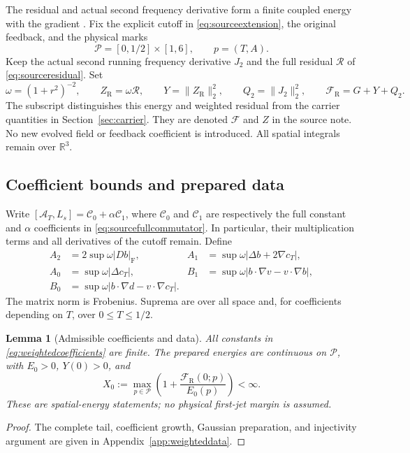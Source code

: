 \documentclass[11pt]{article}
\numberwithin{equation}{section}
\newtheorem{lemma}[theorem]{Lemma}
\newcommand{\R}{\mathbb R}
\begin{document}
The residual and actual second frequency derivative form a finite
coupled energy with the gradient
\cite{WeightedClosureNote,SourceCouplingNote}. Fix the explicit cutoff in
\eqref{eq:sourceextension}, the original feedback, and the physical marks
\begin{equation}\label{eq:weightedmarks}
 \mathscr P=[0,1/2]\times[1,6],\qquad p=(T,A).
\end{equation}
Keep the actual second running frequency derivative $J_2$ and the full
residual $\mathcal R$ of \eqref{eq:sourceresidual}. Set
\begin{equation}\label{eq:weightedenergy}
 \omega=(1+r^2)^{-2},\qquad Z_{\mathrm R}=\omega\mathcal R,
 \qquad Y=\|Z_{\mathrm R}\|_2^2,\qquad Q_2=\|J_2\|_2^2,
 \qquad \mathcal F_{\mathrm R}=G+Y+Q_2.
\end{equation}
The subscript distinguishes this energy and weighted residual from the
carrier quantities in Section~\ref{sec:carrier}. They are denoted
$\mathcal F$ and $Z$ in the source note. No new evolved field or feedback
coefficient is introduced. All spatial integrals remain over $\R^3$.

\subsection{Coefficient bounds and prepared data}

Write $[\mathcal A_T,L_s]=\mathscr C_0+\alpha\mathscr C_1$, where
$\mathscr C_0$ and $\mathscr C_1$ are respectively the full constant and
$\alpha$ coefficients in \eqref{eq:sourcefullcommutator}. In particular,
their multiplication terms and all derivatives of the cutoff remain.
Define
\begin{align}
 A_2&=2\sup\omega|Db|_{\mathrm F},&
 A_1&=\sup\omega|\Delta b+2\nabla c_T|,\nonumber\\
 A_0&=\sup\omega|\Delta c_T|,&
 B_1&=\sup\omega|b\cdot\nabla v-v\cdot\nabla b|,\nonumber\\
 B_0&=\sup\omega|b\cdot\nabla d-v\cdot\nabla c_T|.
 \label{eq:weightedcoefficients}
\end{align}
The matrix norm is Frobenius. Suprema are over all space and, for
coefficients depending on $T$, over $0\le T\le1/2$.

\begin{lemma}[Admissible coefficients and data]\label{lem:weighteddata}
All constants in \eqref{eq:weightedcoefficients} are finite. The prepared
energies are continuous on $\mathscr P$, with $E_0>0$, $Y(0)>0$, and
\begin{equation}\label{eq:weightedinitialcompactness}
 X_0:=\max_{p\in\mathscr P}
       \left(1+\frac{\mathcal F_{\mathrm R}(0;p)}{E_0(p)}\right)<\infty.
\end{equation}
These are spatial-energy statements; no physical first-jet margin is
assumed.
\end{lemma}
\begin{proof}
The complete tail, coefficient growth, Gaussian preparation, and
injectivity argument are given in Appendix~\ref{app:weighteddata}.
\end{proof}
\end{document}
